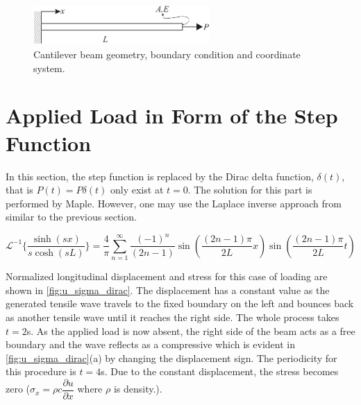 \documentclass{article}
\begin{document}
\begin{figure}[H]
    \centering
    \includegraphics[width = 0.6\textwidth ]{figures/beam.pdf}
    \caption{Cantilever beam geometry, boundary condition and coordinate system.}
    \label{fig:beam}
\end{figure}

\section{Applied Load in Form of the Step Function}

In this section, the step function is replaced by the Dirac delta function, $\delta(t)$, that is $P(t) = P \delta(t)$ only exist at $t = 0$. The solution for this part is performed by Maple. However, one may use the Laplace inverse approach from \cite{Spiegel1965} similar to the previous section.

\begin{equation}
    \mathcal{L}^{-1}\{ \frac{\sinh(sx)}{s \cosh(sL)} \} = \frac{4}{\pi} \sum_{n = 1}^{\infty} \frac{(-1)^n}{(2n - 1)} \sin \left( \frac{(2n-1)\pi}{2L}x\right) \sin \left( \frac{(2n-1)\pi}{2L}t\right)
    \label{eq:d_lap_inv}
\end{equation}

Normalized longitudinal displacement and stress for this case of loading are shown in \cref{fig:u_sigma_dirac}. The displacement has a constant value as the generated tensile wave travels to the fixed boundary on the left and bounces back as another tensile wave until it reaches the right side. The whole process takes $t = 2$s. As the applied load is now absent, the right side of the beam acts as a free boundary and the wave reflects as a compressive which is evident in \cref{fig:u_sigma_dirac}(a) by changing the displacement sign. The periodicity for this procedure is $t = 4$s. Due to the constant displacement, the stress becomes zero ($\sigma_x = \rho c \dfrac{\partial u}{\partial x}$ where $\rho$ is density.).
\end{document}
